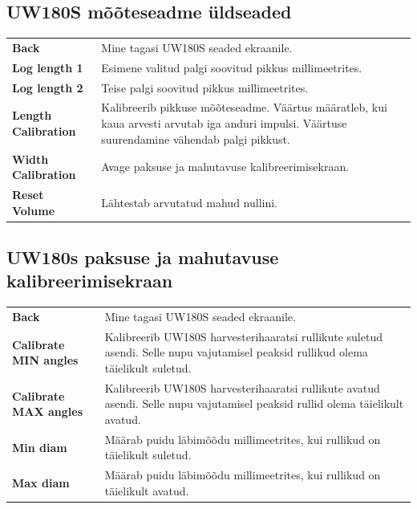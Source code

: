 \documentclass[12pt,a4paper,english]{uvmanual}
\begin{document}
\FloatBarrier
\subsection{UW180S mõõteseadme üldseaded}\label{ch:settings_uw180s_meas}


\begin{tabular}{ L{0.2\textwidth} L{0.66\textwidth} }
\textbf{Back} & Mine tagasi UW180S seaded ekraanile. \\
\textbf{Log length 1} & Esimene valitud palgi soovitud pikkus millimeetrites.  \\
\textbf{Log length 2} &  Teise palgi soovitud pikkus millimeetrites.  \\
\textbf{Length Calibration} & Kalibreerib pikkuse mõõteseadme. Väärtus määratleb, kui kaua arvesti arvutab iga anduri impulsi. Väärtuse suurendamine vähendab palgi pikkust.  \\
\textbf{Width Calibration} & Avage paksuse ja mahutavuse kalibreerimisekraan.  \\
\textbf{Reset Volume} & Lähtestab arvutatud mahud nullini. \\
\end{tabular}

\FloatBarrier
\subsection{UW180s paksuse ja mahutavuse kalibreerimisekraan}\label{ch:settings_uw180s_width}


\begin{tabular}{ L{0.2\textwidth} L{0.66\textwidth} }
\textbf{Back} & Mine tagasi UW180S seaded ekraanile. \\
\textbf{Calibrate MIN angles} & Kalibreerib UW180S harvesterihaaratsi rullikute suletud asendi. Selle nupu vajutamisel peaksid rullikud olema täielikult suletud.  \\
\textbf{Calibrate MAX angles} & Kalibreerib UW180S harvesterihaaratsi rullikute avatud asendi. Selle nupu vajutamisel peaksid rullid olema täielikult avatud.  \\
\textbf{Min diam} & Määrab puidu läbimõõdu millimeetrites, kui rullikud on täielikult suletud.  \\
\textbf{Max diam} & Määrab puidu läbimõõdu millimeetrites, kui rullikud on täielikult avatud.  \\
\end{tabular}
\end{document}
